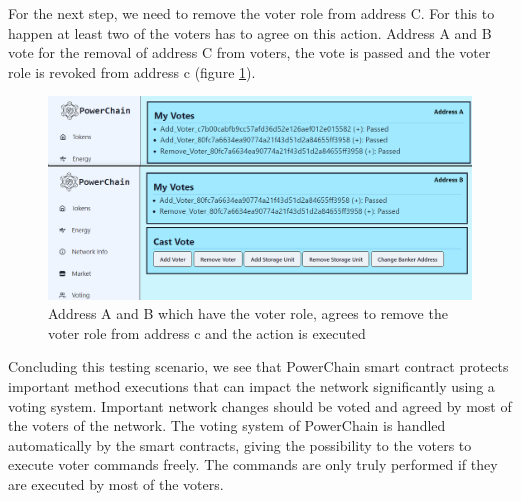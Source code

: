 For the next step, we need to remove the voter role from address C. For this to happen at least two of the voters has to agree
on this action. Address A and B vote for the removal of address C from voters, the vote is passed and the voter role is revoked from address c (figure \ref{fig:remove_voter}).\\ 
\begin{figure}[h!]
    \centering
    \includegraphics[width=\linewidth,frame,scale=0.7]{Figures/remove_voter.png}
    \caption{Address A and B which have the voter role, agrees to remove the voter role from address c and the action is executed}
    \label{fig:remove_voter}
\end{figure}
Concluding this testing scenario, we see that PowerChain smart contract protects important method executions that can impact the network significantly using
a voting system. Important network changes should be voted and agreed by most of the voters of the network. The voting system of PowerChain is handled automatically
by the smart contracts, giving the possibility to the voters to execute voter commands freely. The commands are only truly performed if they are executed by most of
the voters.
